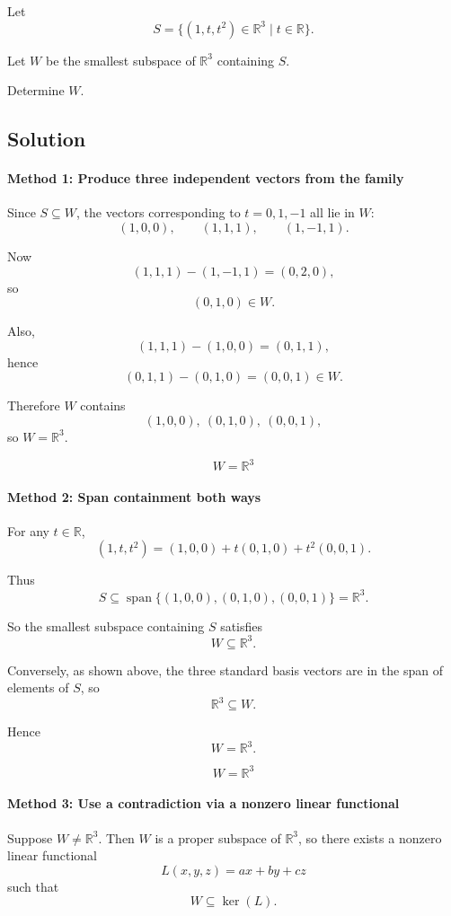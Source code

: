 \documentclass[12pt]{article}
\newcommand{\Span}{\operatorname{span}}
\begin{document}
Let
\[
S=\{(1,t,t^2)\in\mathbb R^3\mid t\in\mathbb R\}.
\]

Let \(W\) be the smallest subspace of \(\mathbb R^3\) containing \(S\).

Determine \(W\).

\subsection{Solution}

\paragraph{Method 1: Produce three independent vectors from the family}

Since \(S\subseteq W\), the vectors corresponding to \(t=0,1,-1\) all lie in \(W\):
\[
(1,0,0),\qquad (1,1,1),\qquad (1,-1,1).
\]

Now
\[
(1,1,1)-(1,-1,1)=(0,2,0),
\]
so
\[
(0,1,0)\in W.
\]

Also,
\[
(1,1,1)-(1,0,0)=(0,1,1),
\]
hence
\[
(0,1,1)-(0,1,0)=(0,0,1)\in W.
\]

Therefore \(W\) contains
\[
(1,0,0),\ (0,1,0),\ (0,0,1),
\]
so \(W=\mathbb R^3\).

\[
\boxed{W=\mathbb R^3}
\]

\paragraph{Method 2: Span containment both ways}

For any \(t\in\mathbb R\),
\[
(1,t,t^2)=(1,0,0)+t(0,1,0)+t^2(0,0,1).
\]

Thus
\[
S\subseteq \Span\{(1,0,0),(0,1,0),(0,0,1)\}=\mathbb R^3.
\]

So the smallest subspace containing \(S\) satisfies
\[
W\subseteq \mathbb R^3.
\]

Conversely, as shown above, the three standard basis vectors are in the span of elements of \(S\), so
\[
\mathbb R^3\subseteq W.
\]

Hence
\[
W=\mathbb R^3.
\]

\[
\boxed{W=\mathbb R^3}
\]

\paragraph{Method 3: Use a contradiction via a nonzero linear functional}

Suppose \(W\neq \mathbb R^3\). Then \(W\) is a proper subspace of \(\mathbb R^3\), so there exists a nonzero linear functional
\[
L(x,y,z)=ax+by+cz
\]
such that
\[
W\subseteq \ker(L).
\]
\end{document}
